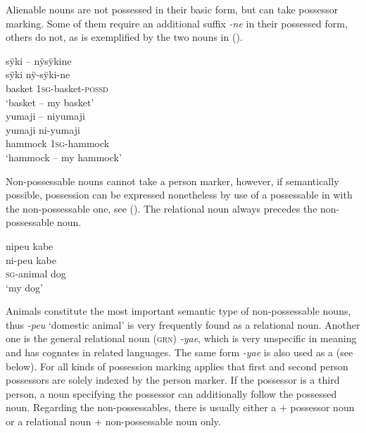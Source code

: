 Alienable nouns are not possessed in their basic form, but can take possessor marking. Some of them require an additional suffix \textit{-ne} in their possessed form, others do not, as is exemplified by the two nouns in (). 

\ea\label{ex:Sketch-Al}
  \ea
\begingl
\glpreamble sÿki – nÿsÿkine\\
\gla sÿki nÿ-sÿki-ne\\
\glb basket 1\textsc{sg}-basket-\textsc{possd}\\
\glft ‘basket – my basket’\\
\endgl
  \ex
\begingl
\glpreamble yumaji – niyumaji\\
\gla yumaji ni-yumaji\\
\glb hammock 1\textsc{sg}-hammock\\
\glft ‘hammock – my hammock’\\
\endgl
\z
\xe


Non-possessable nouns cannot take a person marker, however, if semantically possible, possession can be expressed nonetheless by use of a possessable  in  with the non-possessable one, see (). The relational noun always precedes the non-possessable noun.

\ea\label{ex:Sketch-Nonposs}
\begingl
\glpreamble nipeu kabe\\
\gla ni-peu kabe\\
\textsc{sg}-animal dog\\
\glft ‘my dog’\\
\endgl
\xe

\hspace*{-4.2pt}Animals constitute the most important semantic type of non-possessable nouns, thus \textit{-peu} ‘domestic animal’ is very frequently found as a relational noun. Another one is the general relational noun (\textsc{grn}) \textit{-yae}, which is very unspecific in meaning and has cognates in related languages. The same form \textit{-yae} is also used as a  (see below). For all kinds of possession marking applies that first and second person possessors are solely indexed by the person marker. If the possessor is a third person, a noun specifying the possessor can additionally follow the possessed noun. Regarding the non-possessables, there is usually either a  + possessor noun or a relational noun + non-possessable noun only.

